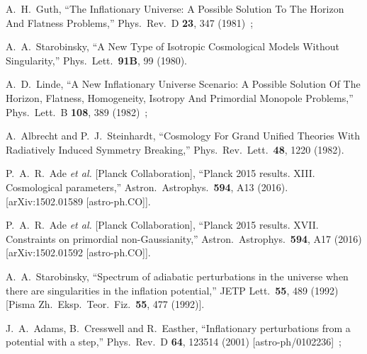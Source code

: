\documentclass[12pt]{article}
\begin{document}
\begin{thebibliography}{99}


  A.~H.~Guth,
  ``The Inflationary Universe: A Possible Solution To The Horizon And Flatness Problems,''
  Phys.\ Rev.\  D {\bf 23}, 347 (1981)~;
  
  A.~A.~Starobinsky,
  ``A New Type of Isotropic Cosmological Models Without Singularity,''
  Phys.\ Lett.\  {\bf 91B}, 99 (1980).
  
  
  A.~D.~Linde,
  ``A New Inflationary Universe Scenario: A Possible Solution Of The Horizon, Flatness, Homogeneity, Isotropy And Primordial Monopole Problems,''
  Phys.\ Lett.\  B {\bf 108}, 389 (1982)~;
  
  A.~Albrecht and P.~J.~Steinhardt,
  ``Cosmology For Grand Unified Theories With Radiatively Induced Symmetry Breaking,''
  Phys.\ Rev.\ Lett.\  {\bf 48}, 1220 (1982).
  
  
  P.~A.~R.~Ade {\it et al.} [Planck Collaboration],
  ``Planck 2015 results. XIII. Cosmological parameters,''
Astron.\ Astrophys.\  {\bf 594}, A13 (2016).
[arXiv:1502.01589 [astro-ph.CO]].
  
  P.~A.~R.~Ade {\it et al.} [Planck Collaboration],
  ``Planck 2015 results. XVII. Constraints on primordial non-Gaussianity,''
  Astron.\ Astrophys.\  {\bf 594}, A17 (2016)
  [arXiv:1502.01592 [astro-ph.CO]].
  
  
  
  
  A.~A.~Starobinsky,
  ``Spectrum of adiabatic perturbations in the universe when there are singularities in the inflation potential,''
  JETP Lett.\  {\bf 55}, 489 (1992)
  [Pisma Zh.\ Eksp.\ Teor.\ Fiz.\  {\bf 55}, 477 (1992)].






  J.~A.~Adams, B.~Cresswell and R.~Easther,
  ``Inflationary perturbations from a potential with a step,''
  Phys.\ Rev.\ D {\bf 64}, 123514 (2001)
  [astro-ph/0102236]~;
  

\end{thebibliography}
\end{document}

